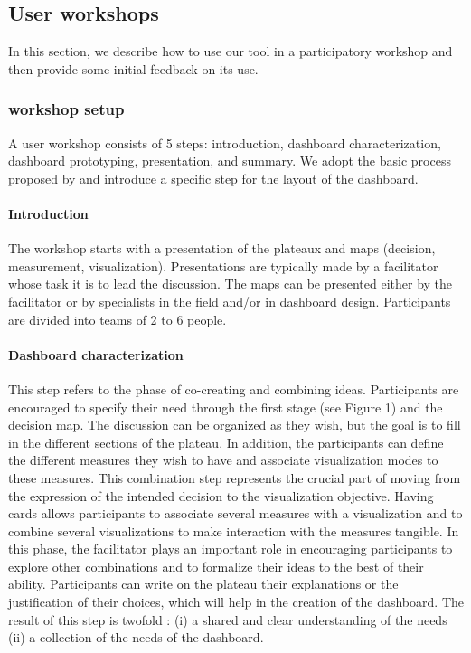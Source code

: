 \documentclass[preprint,12pt]{elsarticle}
\begin{document}
\subsection{User workshops}
In this section, we describe how to use our tool in a participatory workshop and then provide some initial feedback on its use.
\subsubsection{workshop setup}
A user workshop consists of 5 steps: introduction, dashboard characterization, dashboard prototyping, presentation, and summary. We adopt the basic process proposed by \citet*{lucero2016designing} and introduce a specific step for the layout of the dashboard.

\paragraph{Introduction}
The workshop starts with a presentation of the plateaux and maps (decision, measurement, visualization). Presentations are typically made by a facilitator whose task it is to lead the discussion. The maps can be presented either by the facilitator or by specialists in the field and/or in dashboard design. Participants are divided into teams of 2 to 6 people.
 
\paragraph{Dashboard characterization}
This step refers to the phase of co-creating and combining ideas. Participants are encouraged to specify their need through the first stage (see Figure 1) and the decision map. The discussion can be organized as they wish, but the goal is to fill in the different sections of the plateau. In addition, the participants can define the different measures they wish to have and associate visualization modes to these measures.
This combination step represents the crucial part of moving from the expression of the intended decision to the visualization objective. Having cards allows participants to associate several measures with a visualization and to combine several visualizations to make interaction with the measures tangible. In this phase, the facilitator plays an important role in encouraging participants to explore other combinations and to formalize their ideas to the best of their ability. Participants can write on the plateau their explanations or the justification of their choices, which will help in the creation of the dashboard. The result of this step is twofold : (i) a shared and clear understanding of the needs (ii) a collection of the needs of the dashboard.
\end{document}
